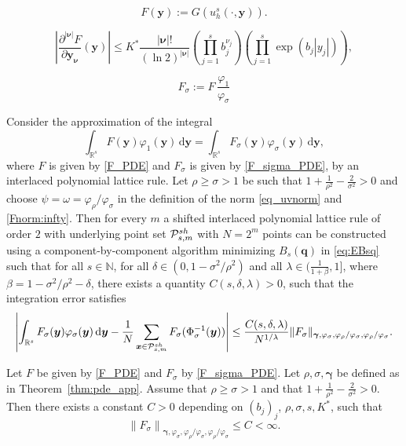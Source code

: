 \documentclass[10pt,a4paper]{amsart}
\newcommand{\NN}{\mathbb{N}}
\newcommand{\bsgamma}{\boldsymbol{\gamma}}
\newcommand{\bsq}{\boldsymbol{q}}
\newcommand{\bsx}{\boldsymbol{x}}
\newcommand{\bsy}{\boldsymbol{y}}
\newcommand{\cP}{\mathcal{P}}
\begin{document}
\begin{equation}\label{F_PDE}
F(\bsy) := G(u_h^s(\cdot, \bsy)). 
\end{equation}

\begin{equation}\label{est:norm:assumpt}
\left|\frac{\partial^{|\boldsymbol{\nu}|} F}{\partial \bsy_{\boldsymbol{\nu}}}(\boldsymbol{y}) \right| \le K^\ast \frac{|\boldsymbol{\nu}|!}{(\ln 2)^{|\boldsymbol{\nu}|}} \left( \prod_{j =1}^s b_j^{\nu_j} \right) \left( \prod_{j=1}^s \exp(b_j |y_j|) \right),
\end{equation}

\begin{equation}\label{F_sigma_PDE}
F_\sigma:=F \, \frac{\varphi_1}{\varphi_\sigma}
\end{equation}

\begin{theorem}\label{thm:pde_app}
Consider the approximation of the integral $$\int_{\mathbb{R}^s} F(\bsy) \varphi_1(\bsy) \,\mathrm{d} \bsy = \int_{\mathbb{R}^s} F_\sigma(\bsy) \varphi_\sigma(\bsy) \,\mathrm{d} \bsy, $$ where $F$  is given by \eqref{F_PDE} and $F_\sigma$ is given by \eqref{F_sigma_PDE}, by an interlaced polynomial lattice rule. Let $\rho \ge \sigma > 1$ be such that $1 + \tfrac{1}{\rho^2} - \tfrac{2}{\sigma^2} > 0$ and choose $\psi=\omega=\varphi_{\rho}/\varphi_{\sigma}$ in the definition of the norm \eqref{eq_uvnorm} and \eqref{Fnorm:infty}.
%
Then for every $m$ a shifted interlaced polynomial lattice rule of order $2$ with underlying point set $\cP_{s,m}^{{\rm sh}}$ with $N=2^m$ points can be constructed using a component-by-component algorithm minimizing $B_s(\bsq)$ in \eqref{eq:EBsq} such that for all $s \in \NN$, for all $\delta \in (0, 1-\sigma^2/\rho^2)$ and all $\lambda \in (\frac{1}{1+\beta},1]$, where $\beta = 1 - \sigma^2/\rho^2 - \delta$, there exists a quantity $C(s,\delta,\lambda) > 0$, such that the integration error satisfies 
\begin{equation*}
\left| \int_{\mathbb{R}^s} F_\sigma(\bsy) \varphi_\sigma(\bsy) \,\mathrm{d} \bsy - \frac{1}{N} \sum_{\bsx \in \cP_{s,m}^{{\rm sh}}} F_\sigma(\Phi_\sigma^{-1}(\bsy)) \right| \le \frac{C(s,\delta,\lambda)}{N^{1/\lambda}} %
\|F_\sigma\|_{\bsgamma, \varphi_\sigma, \varphi_\rho/\varphi_\sigma, \varphi_\rho/\varphi_\sigma}.
\end{equation*} 


\end{theorem}

\begin{lemma}\label{lem:bound_normF}
Let $F$ be given by \eqref{F_PDE} and $F_\sigma$ by \eqref{F_sigma_PDE}. Let $\rho, \sigma, \bsgamma$ be defined as in Theorem~\ref{thm:pde_app}. Assume that $\rho \ge \sigma > 1$ and that $1 + \tfrac{1}{\rho^2} - \tfrac{2}{\sigma^2} > 0$. Then there exists a constant $C> 0$ depending on  $(b_j)_j$, $\rho, \sigma, s, K^*$, such that
\begin{equation*}
\left\| F_{\sigma} \right\|_{\bsgamma,\varphi_\sigma,\varphi_\rho/\varphi_\sigma,\varphi_\rho / \varphi_\sigma} \le C < \infty. %
\end{equation*}
\end{lemma}
\end{document}
